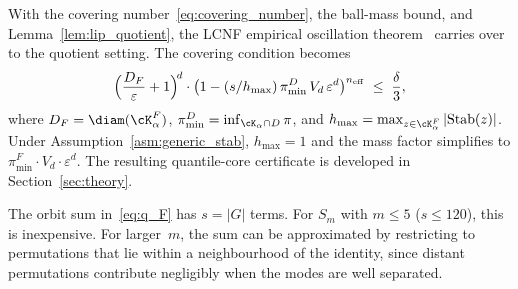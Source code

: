 \noindent
With the covering number~\eqref{eq:covering_number}, the ball-mass
bound, and Lemma~\ref{lem:lip_quotient}, the LCNF empirical
oscillation theorem~\citep[Theorem~5.1]{LCNF} carries over to the
quotient setting.  The covering condition becomes
\begin{equation}\label{eq:covering_cond_F}
  \Bigl(\frac{D_F}{\varepsilon} + 1\Bigr)^{\!d}
  \cdot
  \bigl(1 - (s/h_{\max})\,\pi_{\min}^D\, V_d\, \varepsilon^d\bigr)^{n_{\mathrm{eff}}}
  \;\leq\; \frac{\delta}{3},
\end{equation}
where $D_F = \diam(\cK_\alpha^F)$,
$\pi_{\min}^D = \inf_{\cK_\alpha \cap D}\pi$, and
$h_{\max} = \max_{z \in \cK_\alpha^F}|\mathrm{Stab}(z)|$.
Under Assumption~\ref{asm:generic_stab}, $h_{\max} = 1$ and the
mass factor simplifies to $\pi_{\min}^F \cdot V_d \cdot \varepsilon^d$.
The resulting quantile-core certificate is developed in
Section~\ref{sec:theory}.

\begin{remark}\label{rem:scalability}
  The orbit sum in~\eqref{eq:q_F} has $s = |G|$ terms.
  For $S_m$ with $m \leq 5$ ($s \leq 120$), this is inexpensive.
  For larger~$m$, the sum can be approximated by restricting to
  permutations that lie within a neighbourhood of the identity,
  since distant permutations contribute negligibly when the modes
  are well separated.
\end{remark}
